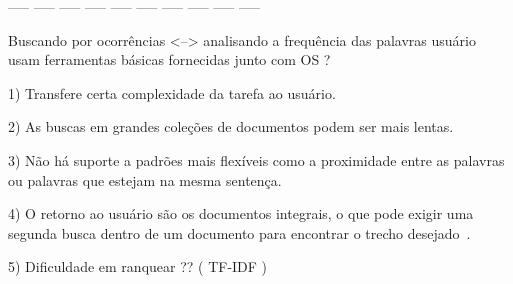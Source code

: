 





----- ----- ----- ----- ----- ----- ----- ----- ----- -----


Buscando por ocorrências <--> analisando a frequência das palavras
usuário usam ferramentas básicas fornecidas junto com OS ?


1) Transfere certa complexidade da tarefa ao usuário.

2) As buscas em grandes coleções de documentos podem ser mais lentas. 

3) Não há suporte a padrões mais flexíveis como a proximidade entre as palavras ou palavras que estejam na mesma sentença.

4) O retorno ao usuário são os documentos integrais, o que pode exigir uma segunda busca dentro de um documento para encontrar o trecho desejado~\cite{Aggarwal2012,Manning2008}. 

5) Dificuldade em ranquear ?? ( TF-IDF )






